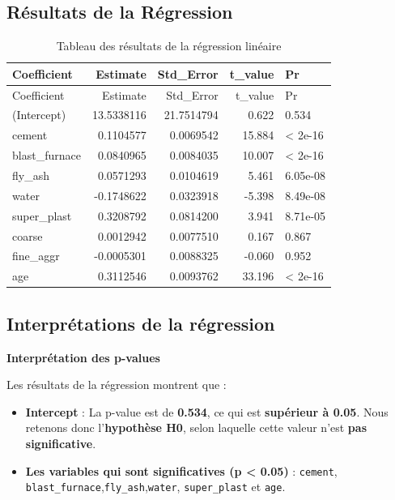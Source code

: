 \documentclass[
  12pt,
]{article}
\begin{document}
\subsection{Résultats de la
Régression}\label{ruxe9sultats-de-la-ruxe9gression}

\begin{longtable}[]{@{}lrrrl@{}}
\caption{Tableau des résultats de la régression linéaire}\tabularnewline
\toprule\noalign{}
Coefficient & Estimate & Std\_Error & t\_value & Pr \\
\midrule\noalign{}
\endfirsthead
\toprule\noalign{}
Coefficient & Estimate & Std\_Error & t\_value & Pr \\
\midrule\noalign{}
\endhead
\bottomrule\noalign{}
\endlastfoot
(Intercept) & 13.5338116 & 21.7514794 & 0.622 & 0.534 \\
cement & 0.1104577 & 0.0069542 & 15.884 & \textless{} 2e-16 \\
blast\_furnace & 0.0840965 & 0.0084035 & 10.007 & \textless{} 2e-16 \\
fly\_ash & 0.0571293 & 0.0104619 & 5.461 & 6.05e-08 \\
water & -0.1748622 & 0.0323918 & -5.398 & 8.49e-08 \\
super\_plast & 0.3208792 & 0.0814200 & 3.941 & 8.71e-05 \\
coarse & 0.0012942 & 0.0077510 & 0.167 & 0.867 \\
fine\_aggr & -0.0005301 & 0.0088325 & -0.060 & 0.952 \\
age & 0.3112546 & 0.0093762 & 33.196 & \textless{} 2e-16 \\
\end{longtable}

\subsection{Interprétations de la
régression}\label{interpruxe9tations-de-la-ruxe9gression}

\textbf{Interprétation des p-values}

Les résultats de la régression montrent que :

\begin{itemize}
\item
  \textbf{Intercept} : La p-value est de \textbf{0.534}, ce qui est
  \textbf{supérieur à 0.05}. Nous retenons donc l'\textbf{hypothèse H0},
  selon laquelle cette valeur n'est \textbf{pas significative}.
\item
  \textbf{Les variables qui sont significatives (p \textless{} 0.05)} :
  \texttt{cement},
  \texttt{blast\_furnace},\texttt{fly\_ash},\texttt{water},
  \texttt{super\_plast} et \texttt{age}.
\end{itemize}
\end{document}
